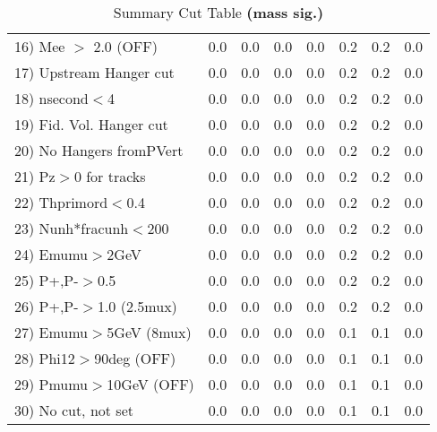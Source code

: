 \begin{table}[h!]
{{\begin{tabular}{||l||r|r|r|r|r||r||r||}
 16) Mee $>$ 2.0  (OFF)   &       0.0 &       0.0 &       0.0 &       0.0 &       0.2 &       0.2 &       0.0 \\
 17) Upstream Hanger cut  &       0.0 &       0.0 &       0.0 &       0.0 &       0.2 &       0.2 &       0.0 \\
 18) nsecond$<$4          &       0.0 &       0.0 &       0.0 &       0.0 &       0.2 &       0.2 &       0.0 \\
 19) Fid. Vol. Hanger cut &       0.0 &       0.0 &       0.0 &       0.0 &       0.2 &       0.2 &       0.0 \\
 20) No Hangers fromPVert &       0.0 &       0.0 &       0.0 &       0.0 &       0.2 &       0.2 &       0.0 \\
 21) Pz$>$0 for tracks    &       0.0 &       0.0 &       0.0 &       0.0 &       0.2 &       0.2 &       0.0 \\
 22) Thprimord$<$0.4      &       0.0 &       0.0 &       0.0 &       0.0 &       0.2 &       0.2 &       0.0 \\
 23) Nunh*fracunh$<$200   &       0.0 &       0.0 &       0.0 &       0.0 &       0.2 &       0.2 &       0.0 \\
 24) Emumu$>$2GeV         &       0.0 &       0.0 &       0.0 &       0.0 &       0.2 &       0.2 &       0.0 \\
 25) P+,P-$>$0.5          &       0.0 &       0.0 &       0.0 &       0.0 &       0.2 &       0.2 &       0.0 \\
 26) P+,P-$>$1.0 (2.5mux) &       0.0 &       0.0 &       0.0 &       0.0 &       0.2 &       0.2 &       0.0 \\
 27) Emumu$>$5GeV  (8mux) &       0.0 &       0.0 &       0.0 &       0.0 &       0.1 &       0.1 &       0.0 \\
 28) Phi12$>$90deg  (OFF) &       0.0 &       0.0 &       0.0 &       0.0 &       0.1 &       0.1 &       0.0 \\
 29) Pmumu$>$10GeV  (OFF) &       0.0 &       0.0 &       0.0 &       0.0 &       0.1 &       0.1 &       0.0 \\
 30) No cut, not set      &       0.0 &       0.0 &       0.0 &       0.0 &       0.1 &       0.1 &       0.0 \\
 \hline
 \hline
 \end{tabular}
 \caption{Summary Cut Table \textbf{ (mass sig.) }}
 \label{tab-sumcut}
 }}
 \end{table}
 \endinput
